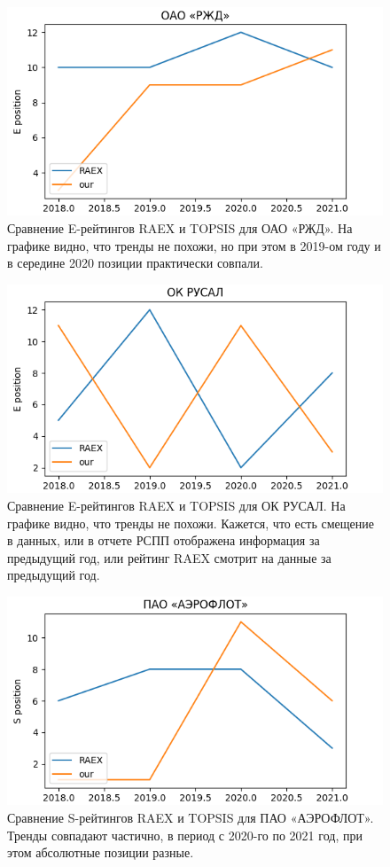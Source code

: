 \documentclass[a4paper, 14pt]{extarticle}
\begin{document}
\begin{figure}[H]
\centering
\includegraphics[width=0.8\linewidth]{images/E_ОАО «РЖД».png}
\caption{Сравнение E-рейтингов RAEX и TOPSIS для ОАО «РЖД». На графике видно, что тренды не похожи, но при этом в 2019-ом году и в середине 2020 позиции практически совпали.}
\label{fig:e_rgd}
\end{figure}

\begin{figure}[H]
\centering
\includegraphics[width=0.8\linewidth]{images/E_ОК РУСАЛ.png}
\caption{Сравнение E-рейтингов RAEX и TOPSIS для ОК РУСАЛ. На графике видно, что тренды не похожи. Кажется, что есть смещение в данных, или в отчете РСПП отображена информация за предыдущий год, или рейтинг RAEX смотрит на данные за предыдущий год.}
\label{fig:e_rusal}
\end{figure}

\begin{figure}[H]
\centering
\includegraphics[width=0.8\linewidth]{images/S_ПАО «АЭРОФЛОТ».png}
\caption{Сравнение S-рейтингов RAEX и TOPSIS для ПАО «АЭРОФЛОТ». Тренды совпадают частично, в период с 2020-го по 2021 год, при этом абсолютные позиции разные.}
\label{fig:s_aeroflot}
\end{figure}
\end{document}
